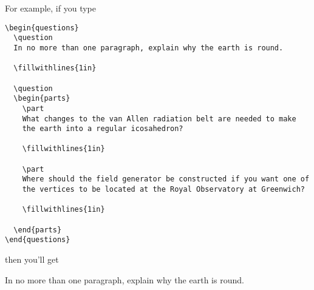 \documentclass[12pt]{exam}
\begin{document}
For example, if you type
\begin{verbatim}
\begin{questions}
  \question 
  In no more than one paragraph, explain why the earth is round.

  \fillwithlines{1in}
  
  \question
  \begin{parts}
    \part
    What changes to the van Allen radiation belt are needed to make
    the earth into a regular icosahedron?

    \fillwithlines{1in}

    \part
    Where should the field generator be constructed if you want one of
    the vertices to be located at the Royal Observatory at Greenwich?

    \fillwithlines{1in}

  \end{parts}
\end{questions}
\end{verbatim}
then you'll get
\begin{questions}
  \question 
  In no more than one paragraph, explain why the earth is round.

  \fillwithlines{1in}
  
  \question
\end{questions}
\end{document}
